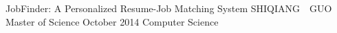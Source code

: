 \maketitlepage
{JobFinder: A Personalized Resume-Job Matching System
}   %
{SHIQIANG~~GUO}%
{Master of Science}                %
{October 2014}%
{Computer Science}         %
